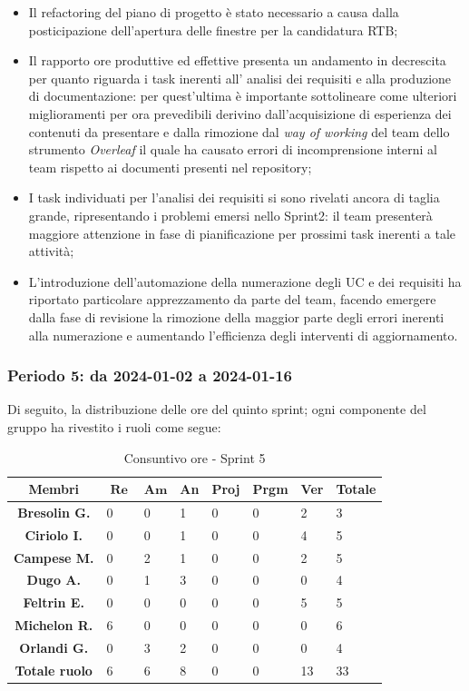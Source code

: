 \documentclass[10pt, a4paper]{article}
\begin{document}
\begin{itemize}
\item Il refactoring del piano di progetto è stato necessario a causa dalla posticipazione dell'apertura delle finestre per la candidatura RTB;
\item Il rapporto ore produttive ed effettive presenta un andamento in decrescita per quanto riguarda i task inerenti all' analisi dei requisiti e alla produzione di documentazione: per 
quest'ultima è importante sottolineare come ulteriori miglioramenti per ora prevedibili derivino dall'acquisizione di esperienza dei contenuti da presentare e dalla rimozione dal \textit{way of working\pg} del team
dello strumento \textit{Overleaf} il quale ha causato errori di incomprensione interni al team rispetto ai documenti presenti nel repository;
\item I task individuati per l'analisi dei requisiti si sono rivelati ancora di taglia grande, ripresentando i problemi emersi nello Sprint2: il team presenterà maggiore attenzione
in fase di pianificazione per prossimi task inerenti a tale attività;
\item L'introduzione dell'automazione della numerazione degli UC e dei requisiti ha riportato particolare apprezzamento da parte del team, facendo emergere dalla fase di revisione
la rimozione della maggior parte degli errori inerenti alla numerazione e aumentando l'efficienza degli interventi di aggiornamento. 
\end{itemize}
 

\subsubsection{Periodo 5: da 2024-01-02 a 2024-01-16}
Di seguito, la distribuzione delle ore del quinto sprint; ogni componente del gruppo ha rivestito i ruoli come segue:
\begin{table}[H]
    \begin{tabularx}{\textwidth}{c|X|X|X|X|X|X|X}
        \textbf{Membri} & $\operatorname{\textbf{Re}}$ & $\mathrm{\textbf{Am}}$ & \textbf{An} & \textbf{Proj} & \textbf{Prgm} & \textbf{Ver} & \textbf{Totale} \\
        \hline
        \textbf{Bresolin G.} & 0 & 0 & 1 & 0 & 0 & 2 & 3 \\
        \hline
        \textbf{Ciriolo I.}  & 0 & 0 & 1 & 0 & 0 & 4 & 5 \\
        \hline
        \textbf{Campese M.}  & 0 & 2 & 1 & 0 & 0 & 2 & 5 \\
        \hline
        \textbf{Dugo A.}     & 0 & 1 & 3 & 0 & 0 & 0 & 4 \\
        \hline
        \textbf{Feltrin E.}  & 0 & 0 & 0 & 0 & 0 & 5 & 5 \\
        \hline
        \textbf{Michelon R.} & 6 & 0 & 0 & 0 & 0 & 0 & 6 \\
        \hline
        \textbf{Orlandi G.}  & 0 & 3 & 2 & 0 & 0 & 0 & 4 \\
        \hline
        \textbf{Totale ruolo} & 6 & 6 & 8 & 0 & 0 & 13 & 33 \\
    \end{tabularx}
    \caption{Consuntivo ore - Sprint 5}
\end{table}
\end{document}
